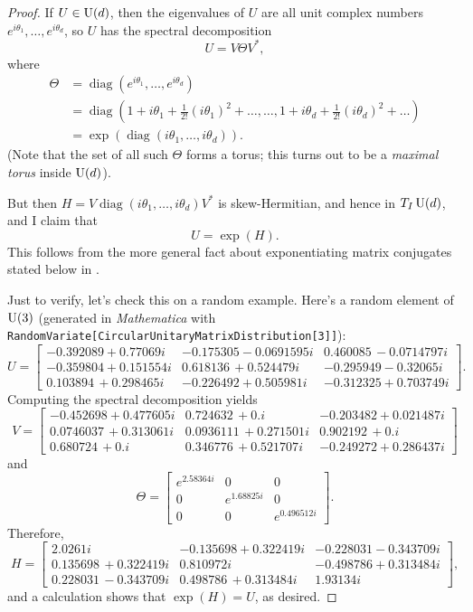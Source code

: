 \begin{proof}
	If $U \in \operatorname{U}(d)$, then the eigenvalues of $U$ are all unit complex numbers $e^{i \theta_1}, \dots , e^{i \theta_d}$, so $U$ has the spectral decomposition
	\[
		U = V \Theta V^\ast,
	\]
	where
	\begin{align*}
		\Theta & = \operatorname{diag}\left(e^{i \theta_1}, \dots , e^{i \theta_d}\right) \\
		& = \operatorname{diag}\left(1 + i \theta_1 + \frac{1}{2!} \left(i\theta_1\right)^2 + \dots , \dots , 1 + i \theta_d + \frac{1}{2!} \left(i\theta_d\right)^2 + \dots \right) \\
		& = \exp(\operatorname{diag}(i\theta_1, \dots , i \theta_d)).
	\end{align*}
	(Note that the set of all such $\Theta$ forms a torus; this turns out to be a \emph{maximal torus} inside $\operatorname{U}(d)$).

	But then $H = V \operatorname{diag}(i\theta_1, \dots , i \theta_d)V^\ast$ is skew-Hermitian, and hence in $T_I\operatorname{U}(d)$, and I claim that
	\[
		U = \exp(H).
	\]
	This follows from the more general fact about exponentiating matrix conjugates stated below in .

	Just to verify, let's check this on a random example. Here's a random element of $\operatorname{U}(3)$ (generated in \emph{Mathematica} with {\tt RandomVariate[CircularUnitaryMatrixDistribution[3]]}):
	\[
		U = \begin{bmatrix} -0.392089+0.77069 i & -0.175305-0.0691595 i & 0.460085\, -0.0714797 i \\
 -0.359804+0.151554 i & 0.618136\, +0.524479 i & -0.295949-0.32065 i \\
 0.103894\, +0.298465 i & -0.226492+0.505981 i & -0.312325+0.703749 i \end{bmatrix}.
	\]
	Computing the spectral decomposition yields
	\[
		V = \begin{bmatrix} -0.452698+0.477605 i & 0.724632\, +0. i & -0.203482+0.021487 i \\
 0.0746037\, +0.313061 i & 0.0936111\, +0.271501 i & 0.902192\, +0. i \\
 0.680724\, +0. i & 0.346776\, +0.521707 i & -0.249272+0.286437 i \end{bmatrix}
 \]
 and
 \[
 	 \Theta = \begin{bmatrix} e^{2.58364 i} & 0 & 0 \\
 0 & e^{1.68825 i} & 0 \\
 0 & 0 & e^{0.496512 i} \end{bmatrix}.
	\]
	Therefore,
	\[
		H = \begin{bmatrix} 2.0261 i & -0.135698+0.322419 i & -0.228031-0.343709 i \\
 0.135698\, +0.322419 i & 0.810972 i & -0.498786+0.313484 i \\
 0.228031\, -0.343709 i & 0.498786\, +0.313484 i & 1.93134 i \end{bmatrix},
	\]
	and a calculation shows that $\exp(H) = U$, as desired.
\end{proof}

